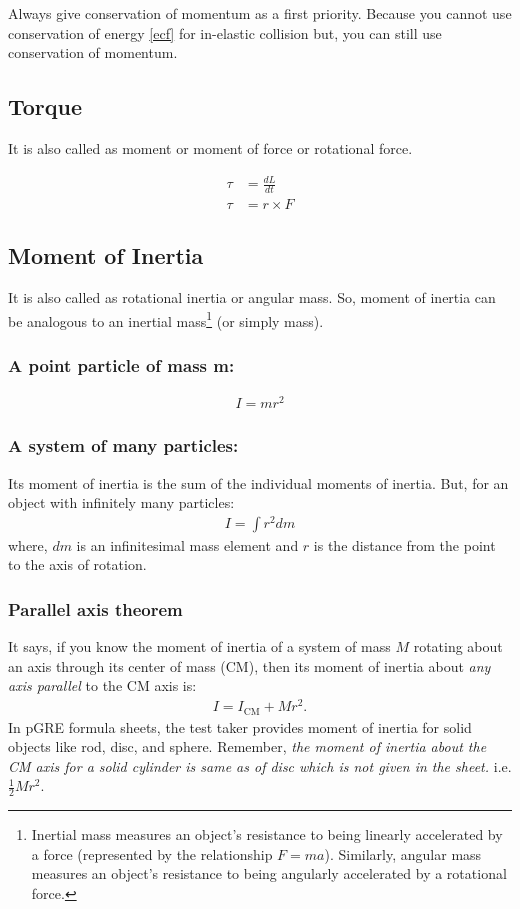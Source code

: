 Always give conservation of momentum as a first priority. Because you cannot use conservation of energy \ref{ecf} for in-elastic collision but, you can still use conservation of momentum. 

\subsection{Torque}

It is also called as moment or moment of force or rotational force.

\begin{align}
\tau &= \frac{dL}{dt} \nonumber \\
\tau &= r \times F 
\end{align}

\subsection{Moment of Inertia}
It is also called as rotational inertia or angular mass. So, moment of inertia can be analogous to an inertial mass\footnote{Inertial mass measures an object's resistance to being linearly accelerated by a force (represented by the relationship $F = ma$). Similarly, angular mass measures an object's resistance to being angularly accelerated by a rotational force.} (or simply mass).

\subsubsection*{A point particle of mass m:}
\begin{align*}
I = m r^{2}
\end{align*}
\subsubsection*{A system of many particles:}
Its moment of inertia is the sum of the individual moments of inertia. But, for an object with infinitely many particles:
\begin{align*}
I = \int r^{2} dm
\end{align*}
where, $dm$ is an infinitesimal mass element and $r$ is the distance from the point to the axis of rotation.

\subsubsection{Parallel axis theorem}
It says, if you know the moment of inertia of a system of mass $M$ rotating about an axis through its center of mass (CM), then its moment of inertia about \emph{any axis parallel} to the CM axis is:
\begin{align}
I = I_{\text{CM}} + M r^{2}.
\end{align}
In pGRE formula sheets, the test taker provides moment of inertia for solid objects like rod, disc, and sphere. Remember, \emph{the moment of inertia about the \emph{CM} axis for a solid cylinder is same as of disc which is not given in the sheet.} i.e. $\frac{1}{2}M r^{2}$.

